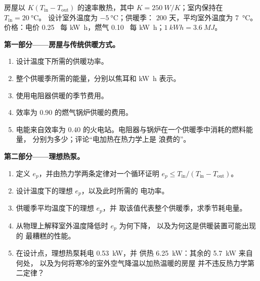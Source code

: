 \begin{problem}
\label{pb:b1:heat-engines:1}
房屋以 $K(T_{\mathrm{in}} - T_{\mathrm{out}})$ 的速率散热，其中
$K = \qty{250}{W/K}$；室内保持在 $T_{\mathrm{in}} = \qty{20}{\degreeCelsius}$。
设计室外温度为 $\qty{-5}{\degreeCelsius}$；供暖季：
$200$ 天，平均室外温度为 \qty{7}{\degreeCelsius}。
价格：电价 0.25~\texteuro{} 每 \unit{kW h}，燃气 0.10~\texteuro{} 每
\unit{kW h}；$\qty{1}{kW h} = \qty{3.6}{MJ}$。

\medskip
\noindent\textbf{第一部分——房屋与传统供暖方式。}
\begin{enumerate}
  \item 设计温度下所需的供暖功率。
  \item 整个供暖季所需的能量，分别以焦耳和 \unit{kW h} 表示。
  \item 使用电阻器供暖的季节费用。
  \item 效率为 $0.90$ 的燃气锅炉供暖的费用。
  \item 电能来自效率为
        $0.40$ 的火电站。电阻器与锅炉在一个供暖季中消耗的燃料能量，
        分别为多少；评论“电加热在热力学上是
        浪费的”。
\end{enumerate}

\medskip
\noindent\textbf{第二部分——理想热泵。}
\begin{enumerate}[resume]
  \item 定义 $e_p$，并由热力学两条定律对一个循环证明
        $e_p \leq T_{\mathrm{in}}/(T_{\mathrm{in}} - T_{\mathrm{out}})$。
  \item 设计温度下的理想 $e_p$，以及此时所需的
        电功率。
  \item 供暖季平均温度下的理想 $e_p$，并
        取该值代表整个供暖季，求季节耗电量。
  \item 从物理上解释室外温度降低时 $e_p$ 为何下降，
        以及为何这是供暖装置可能出现的
        最糟糕的性能。
  \item 在设计点，理想热泵耗电 \qty{0.53}{kW}，并
        供热 \qty{6.25}{kW}：其余的 \qty{5.7}{kW} 来自何处，
        以及为何将寒冷的室外空气降温以加热温暖的房屋
        并不违反热力学第二定律？
\end{enumerate}


\end{problem}
